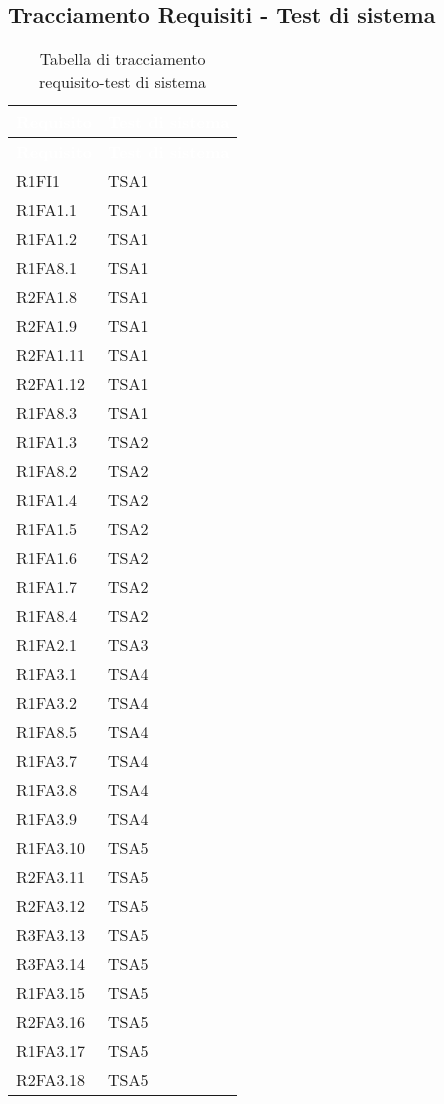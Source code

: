 \subsection{Tracciamento Requisiti - Test di sistema}
{
\renewcommand{\arraystretch}{1.5}
\centering
\begin{longtable}{C{4cm} C{4cm}}
\caption{Tabella di tracciamento requisito-test di sistema}\\
\textcolor{white}{\textbf{Requisito}} & \textcolor{white}{\textbf{Test di sistema}}\\	
\endfirsthead
{}
\textcolor{white}{\textbf{Requisito}} & \textcolor{white}{\textbf{Test di sistema}}\\	
\endhead

R1FI1 & TSA1  \\
R1FA1.1 & TSA1  \\
R1FA1.2 & TSA1  \\
R1FA8.1 & TSA1  \\
R2FA1.8 & TSA1  \\
R2FA1.9 & TSA1  \\
R2FA1.11 & TSA1  \\ 
R2FA1.12 & TSA1  \\ 
R1FA8.3 & TSA1  \\

R1FA1.3 & TSA2  \\
R1FA8.2 & TSA2  \\
R1FA1.4 & TSA2  \\
R1FA1.5 & TSA2  \\
R1FA1.6 & TSA2  \\
R1FA1.7 & TSA2  \\
R1FA8.4 & TSA2  \\

R1FA2.1 & TSA3  \\

R1FA3.1 & TSA4  \\
R1FA3.2 & TSA4  \\
R1FA8.5 & TSA4  \\
R1FA3.7 & TSA4  \\
R1FA3.8 & TSA4  \\
R1FA3.9 & TSA4  \\

R1FA3.10 & TSA5  \\
R2FA3.11 & TSA5  \\
R2FA3.12 & TSA5  \\
R3FA3.13 & TSA5  \\
R3FA3.14 & TSA5  \\
R1FA3.15 & TSA5  \\
R2FA3.16 & TSA5  \\
R1FA3.17 & TSA5  \\
R2FA3.18 & TSA5  \\


\end{longtable}}
